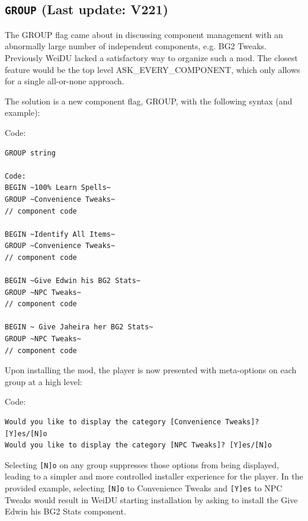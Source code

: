 \documentclass{article}
\def\t#1{{\tt #1}}
\begin{document}
\label{sec-group}\subsection{\t{GROUP} (Last update: V221)}

The GROUP flag came about in discussing component management with an
abnormally large number of independent components, e.g. BG2 Tweaks. Previously
WeiDU lacked a satisfactory way to organize such a mod. The closest feature
would be the top level ASK_EVERY_COMPONENT, which only allows for a single
all-or-none approach.

The solution is a new component flag, GROUP, with the following syntax (and example):

Code:
\begin{verbatim}GROUP string

Code:
BEGIN ~100% Learn Spells~
GROUP ~Convenience Tweaks~
// component code

BEGIN ~Identify All Items~
GROUP ~Convenience Tweaks~
// component code

BEGIN ~Give Edwin his BG2 Stats~
GROUP ~NPC Tweaks~
// component code

BEGIN ~ Give Jaheira her BG2 Stats~
GROUP ~NPC Tweaks~
// component code
\end{verbatim}

Upon installing the mod, the player is now presented with meta-options on
each group at a high level:

Code:
\begin{verbatim}
Would you like to display the category [Convenience Tweaks]? [Y]es/[N]o
Would you like to display the category [NPC Tweaks]? [Y]es/[N]o
\end{verbatim}

Selecting \verb+[N]o+ on any group suppresses those options from being
displayed, leading to a simpler and more controlled installer experience for
the player. In the provided example, selecting \verb+[N]o+ to Convenience
Tweaks and \verb+[Y]es+ to NPC Tweaks would result in WeiDU starting
installation by asking to install the Give Edwin his BG2 Stats component.
\end{document}
